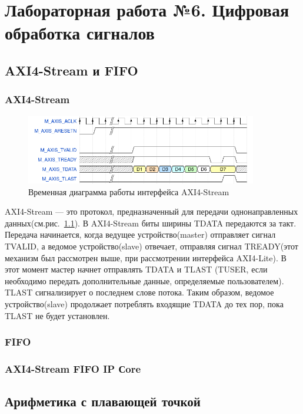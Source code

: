 \documentclass[a4paper,oneside ,10pt]{extreport}
\begin{document}
\chapter{Лабораторная работа №6. Цифровая обработка сигналов}

\section{AXI4-Stream и FIFO}

\subsection{AXI4-Stream}

\begin{figure}[h]
	\centering
	\includegraphics[width=0.9\textwidth]{image/axis_0.png}
	\caption{Временная диаграмма работы интерфейса AXI4-Stream}
	\label{axis}
\end{figure}

AXI4-Stream — это протокол, предназначенный для передачи однонаправленных данных(см.рис.~\ref{axis}). В AXI4-Stream биты ширины TDATA передаются за такт. Передача начинается, когда ведущее устройство(master) отправляет сигнал TVALID, а ведомое устройство(slave) отвечает, отправляя сигнал TREADY(этот механизм был рассмотрен выше, при рассмотрении интерфейса AXI4-Lite). В этот момент мастер начнет отправлять TDATA и TLAST (TUSER, если необходимо передать дополнительные данные, определяемые пользователем). TLAST сигнализирует о последнем слове потока. Таким образом, ведомое устройство(slave) продолжает потреблять входящие TDATA до тех пор, пока TLAST не будет установлен.

\subsection{FIFO}

\subsection{AXI4-Stream FIFO IP Сore}

\section{Арифметика с плавающей точкой}
\end{document}
